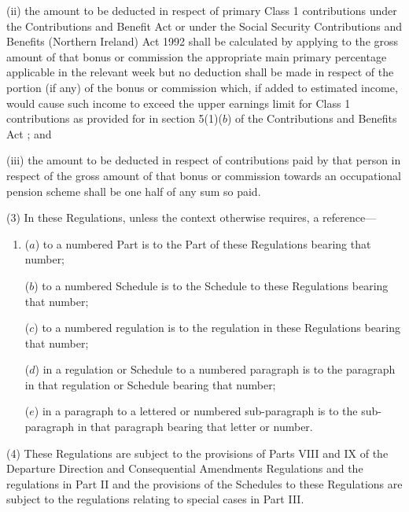 \documentclass[a4paper]{article}
\begin{document}
\begin{enumerate}
\begin{enumerate}
(ii) the amount to be deducted in respect of primary Class 1 contributions under the Contributions and Benefit Act or under the Social Security Contributions and Benefits (Northern Ireland) Act 1992 shall be calculated by applying to the gross amount of that bonus or commission the appropriate main primary percentage applicable in the relevant week
but no deduction shall be made in respect of the portion (if any) of the bonus or commission which, if added to estimated income, would cause such income to exceed the upper earnings limit for Class 1 contributions as provided for in section 5(1)($b$) of the Contributions and Benefits Act%
; and

(iii) the amount to be deducted in respect of contributions paid by that person in respect of the gross amount of that bonus or commission towards an occupational pension scheme shall be one half of any sum so paid.
\end{enumerate}
\end{enumerate}

(3) In these Regulations, unless the context otherwise requires, a reference—
\begin{enumerate}\item[]
($a$) to a numbered Part is to the Part of these Regulations bearing that number;

($b$) to a numbered Schedule is to the Schedule to these Regulations bearing that number;

($c$) to a numbered regulation is to the regulation in these Regulations bearing that number;

($d$) in a regulation or Schedule to a numbered paragraph is to the paragraph in that regulation or Schedule bearing that number;

($e$) in a paragraph to a lettered or numbered sub-paragraph is to the sub-paragraph in that paragraph bearing that letter or number.
\end{enumerate}

(4) 
These Regulations are subject to the provisions of Parts VIII and IX of the Departure Direction and Consequential Amendments Regulations and  %
the regulations in Part II and the provisions of the Schedules to these Regulations are subject to the regulations relating to special cases in Part III.
\end{document}
